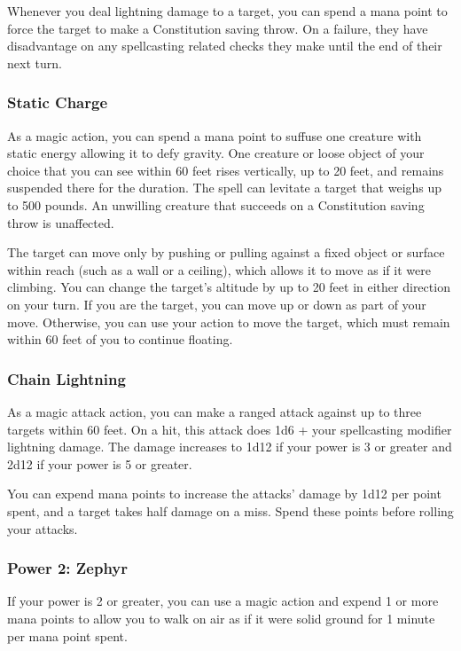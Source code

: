 \documentclass[12pt,letterpaper,twocolumn,openany,nodeprecatedcode,bg=none]{dndbook}
\begin{document}
Whenever you deal lightning damage to a target, you can spend a mana
point to force the target to make a Constitution saving throw. On a
failure, they have disadvantage on any spellcasting related checks they
make until the end of their next turn.

\subsubsection{Static Charge}\label{static-charge}

As a magic action, you can spend a mana point to suffuse one creature
with static energy allowing it to defy gravity. One creature or loose
object of your choice that you can see within 60 feet rises vertically,
up to 20 feet, and remains suspended there for the duration. The spell
can levitate a target that weighs up to 500 pounds. An unwilling
creature that succeeds on a Constitution saving throw is unaffected.

The target can move only by pushing or pulling against a fixed object or
surface within reach (such as a wall or a ceiling), which allows it to
move as if it were climbing. You can change the target's altitude by up
to 20 feet in either direction on your turn. If you are the target, you
can move up or down as part of your move. Otherwise, you can use your
action to move the target, which must remain within 60 feet of you to
continue floating.

\subsubsection{Chain Lightning}\label{chain-lightning}

As a magic attack action, you can make a ranged attack against up to
three targets within 60 feet. On a hit, this attack does 1d6 + your
spellcasting modifier lightning damage. The damage increases to 1d12 if
your power is 3 or greater and 2d12 if your power is 5 or greater.

You can expend mana points to increase the attacks' damage by 1d12 per
point spent, and a target takes half damage on a miss. Spend these
points before rolling your attacks.

\subsubsection{Power 2: Zephyr}\label{power-2-zephyr}

If your power is 2 or greater, you can use a magic action and expend 1
or more mana points to allow you to walk on air as if it were solid
ground for 1 minute per mana point spent.
\end{document}
